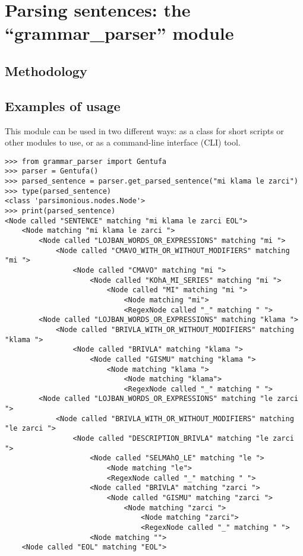 \chapter{Parsing sentences: the ``grammar\_parser'' module}
\label{chap:parser}

\section{Methodology}


\newpage

\section{Examples of usage}

This module can be used in two different ways: as a class for short scripts or other modules to use, or as a command-line interface (CLI) tool.

\begin{lstlisting}[caption=Gentufa class being used by a Python script]
>>> from grammar_parser import Gentufa
>>> parser = Gentufa()
>>> parsed_sentence = parser.get_parsed_sentence("mi klama le zarci")
>>> type(parsed_sentence)
<class 'parsimonious.nodes.Node'>
>>> print(parsed_sentence)
<Node called "SENTENCE" matching "mi klama le zarci EOL">
    <Node matching "mi klama le zarci ">
        <Node called "LOJBAN_WORDS_OR_EXPRESSIONS" matching "mi ">
            <Node called "CMAVO_WITH_OR_WITHOUT_MODIFIERS" matching "mi ">
                <Node called "CMAVO" matching "mi ">
                    <Node called "KOhA_MI_SERIES" matching "mi ">
                        <Node called "MI" matching "mi ">
                            <Node matching "mi">
                            <RegexNode called "_" matching " ">
        <Node called "LOJBAN_WORDS_OR_EXPRESSIONS" matching "klama ">
            <Node called "BRIVLA_WITH_OR_WITHOUT_MODIFIERS" matching "klama ">
                <Node called "BRIVLA" matching "klama ">
                    <Node called "GISMU" matching "klama ">
                        <Node matching "klama ">
                            <Node matching "klama">
                            <RegexNode called "_" matching " ">
        <Node called "LOJBAN_WORDS_OR_EXPRESSIONS" matching "le zarci ">
            <Node called "BRIVLA_WITH_OR_WITHOUT_MODIFIERS" matching "le zarci ">
                <Node called "DESCRIPTION_BRIVLA" matching "le zarci ">
                    <Node called "SELMAhO_LE" matching "le ">
                        <Node matching "le">
                        <RegexNode called "_" matching " ">
                    <Node called "BRIVLA" matching "zarci ">
                        <Node called "GISMU" matching "zarci ">
                            <Node matching "zarci ">
                                <Node matching "zarci">
                                <RegexNode called "_" matching " ">
                    <Node matching "">
    <Node called "EOL" matching "EOL">
\end{lstlisting}


